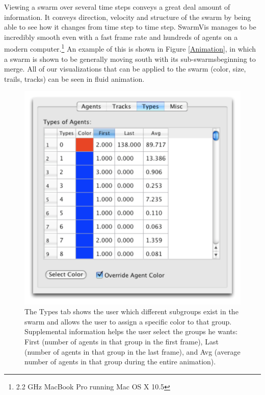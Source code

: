 \documentclass[conference]{IEEEtran}
\begin{document}
Viewing a swarm over several time steps conveys a great deal amount of information. It conveys direction,
velocity and structure of the swarm by being able to see how it changes from time step to time step.
SwarmVis manages to be incredibly smooth even with a fast frame rate and hundreds of agents on a modern
computer.\footnote{2.2 GHz MacBook Pro running Mac OS X 10.5}
An example of this is shown in Figure \ref{Animation}, in which a swarm is shown to be
generally moving south with its sub-swarmsbeginning to merge.
All of our visualizations  that can be applied to the swarm (color, size, trails, tracks) can be seen in fluid animation.








\begin{figure}
\centering
\includegraphics[scale=.5]{images/typestab.pdf}
\caption{
The Types tab shows the user which different subgroups exist in the swarm and allows the user to assign a specific
color to that group. Supplemental information helps the user
select the groups he wants: First (number of agents in that group in the first frame),
Last (number of agents in that group in the last frame), and Avg (average number of agents in that group during
the entire animation).}
\label{TypesTab}
\end{figure}
\end{document}
